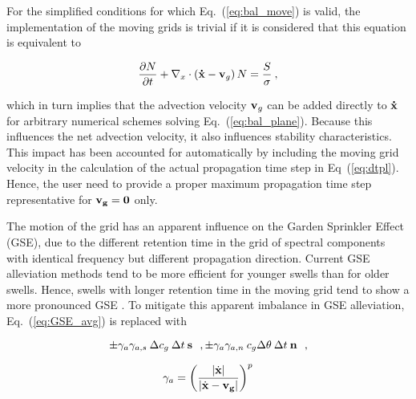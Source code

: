 \vspace{\baselineskip} 
\vspace{\baselineskip} 
\vspace{\baselineskip} 

\noindent
For the simplified conditions for which Eq.~(\ref{eq:bal_move}) is valid, the
implementation of the moving grids is trivial if it is considered that this
equation is equivalent to

\begin{equation}
\frac{\partial N}{\partial t} + 
\nabla_x \cdot \left ( {\bf\dot{x}}-{\bf{v}}_g \right ) N  = 
\frac{S}{\sigma} \: , \label{eq:bal_move2}
\end{equation}

\noindent
which in turn implies that the advection velocity ${\bf{v}}_g$ can be added
directly to ${\bf\dot{x}}$ for arbitrary numerical schemes solving
Eq.~(\ref{eq:bal_plane}). Because this influences the net advection velocity,
it also influences stability characteristics. This impact has been accounted
for automatically by including the moving grid velocity in the calculation of
the actual propagation time step in Eq~(\ref{eq:dtpl}). Hence, the user need
to provide a proper maximum propagation time step representative for $\bf{v}_g
= 0$ only.

The motion of the grid has an apparent influence on the Garden Sprinkler
Effect (GSE), due to the different retention time in the grid of spectral
components with identical frequency but different propagation direction.
Current GSE alleviation methods tend to be more efficient for younger swells
than for older swells. Hence, swells with longer retention time in the moving
grid tend to show a more pronounced GSE \citep[see][]{tol:OMOD05b}. To
mitigate this apparent imbalance in GSE alleviation,  Eq.~(\ref{eq:GSE_avg}) is
replaced with

\begin{equation}
\pm \gamma_a \gamma_{a,s} \: \Delta c_g \: \Delta t \: \mbox{\bf s} \:\:\: ,
\pm \gamma_a \gamma_{a,n} \: c_g \Delta \theta \: \Delta t \: \mbox{\bf n} \:\:\: ,
\label{eq:move_GSE_avg1}
\end{equation}

\begin{equation}
\gamma_a = \left ( \frac{|\dot{\bf{x}}|}{|\dot{\bf{x}}-\bf{v}_g|}
\right ) ^{p}
\label{eq:move_GSE_avg2}
\end{equation}

